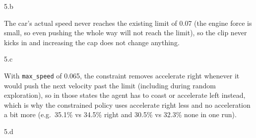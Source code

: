 \LARGE
5.b
\normalsize

\begin{answer}
  The car's actual speed never reaches the existing limit of 0.07 (the engine force is small, so even pushing
  the whole way will not reach the limit), so the clip never kicks in and increasing the cap does not change
  anything.
\end{answer}
\clearpage


\LARGE
5.c
\normalsize

\begin{answer}
  With \texttt{max\_speed} of 0.065, the constraint removes accelerate right whenever it would push the next
  velocity past the limit (including during random exploration), so in those states the agent has to coast or
  accelerate left instead, which is why the constrained policy uses accelerate right less and no
  acceleration a bit more (e.g.\ 35.1\% vs 34.5\% right and 30.5\% vs 32.3\% none in one run).
\end{answer}
\clearpage

\LARGE
5.d
\normalsize

